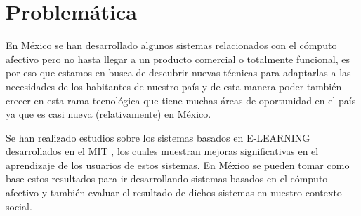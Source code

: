 \section{Problem\'atica}
\noindent
En México se han desarrollado algunos sistemas relacionados con el cómputo afectivo pero no hasta llegar a un producto comercial o totalmente funcional, es por eso que estamos en busca de descubrir nuevas técnicas para adaptarlas a las necesidades de los habitantes de nuestro país y de esta manera poder también crecer en esta rama tecnológica que tiene muchas áreas de oportunidad en el país ya que es casi nueva (relativamente) en México.
\par
Se han realizado estudios sobre los sistemas basados en E-LEARNING desarrollados
en el MIT , los cuales muestran mejoras significativas en el aprendizaje de los usuarios de estos sistemas. En México se pueden tomar como base estos resultados para ir desarrollando sistemas basados en el cómputo afectivo y también evaluar el resultado de dichos sistemas en nuestro contexto social.
\par